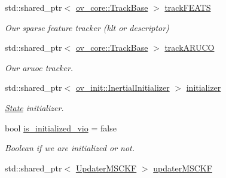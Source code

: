 \begin{DoxyCompactItemize}
\mbox{\label{classov__msckf_1_1VioManager_a3f464a59a277fef9c5d7f29202561c9c}} 
std\+::shared\+\_\+ptr$<$ \hyperlink{classov__core_1_1TrackBase}{ov\+\_\+core\+::\+Track\+Base} $>$ \hyperlink{classov__msckf_1_1VioManager_a3f464a59a277fef9c5d7f29202561c9c}{track\+F\+E\+A\+TS}
\begin{DoxyCompactList}\small\item\em Our sparse feature tracker (klt or descriptor) \end{DoxyCompactList}\item 
\mbox{\label{classov__msckf_1_1VioManager_a534feb840d93f24dfd0171b86d996a51}} 
std\+::shared\+\_\+ptr$<$ \hyperlink{classov__core_1_1TrackBase}{ov\+\_\+core\+::\+Track\+Base} $>$ \hyperlink{classov__msckf_1_1VioManager_a534feb840d93f24dfd0171b86d996a51}{track\+A\+R\+U\+CO}
\begin{DoxyCompactList}\small\item\em Our aruoc tracker. \end{DoxyCompactList}\item 
\mbox{\label{classov__msckf_1_1VioManager_a9a29e966de741d42411c4c6c5ed2fea1}} 
std\+::shared\+\_\+ptr$<$ \hyperlink{classov__init_1_1InertialInitializer}{ov\+\_\+init\+::\+Inertial\+Initializer} $>$ \hyperlink{classov__msckf_1_1VioManager_a9a29e966de741d42411c4c6c5ed2fea1}{initializer}
\begin{DoxyCompactList}\small\item\em \hyperlink{classov__msckf_1_1State}{State} initializer. \end{DoxyCompactList}\item 
\mbox{\label{classov__msckf_1_1VioManager_af39939911eb700d326389255b75738c9}} 
bool \hyperlink{classov__msckf_1_1VioManager_af39939911eb700d326389255b75738c9}{is\+\_\+initialized\+\_\+vio} = false
\begin{DoxyCompactList}\small\item\em Boolean if we are initialized or not. \end{DoxyCompactList}\item 
\mbox{\label{classov__msckf_1_1VioManager_a9a12150c9f5297c07e82ae1a19539767}} 
std\+::shared\+\_\+ptr$<$ \hyperlink{classov__msckf_1_1UpdaterMSCKF}{Updater\+M\+S\+C\+KF} $>$ \hyperlink{classov__msckf_1_1VioManager_a9a12150c9f5297c07e82ae1a19539767}{updater\+M\+S\+C\+KF}

\end{DoxyCompactItemize}
